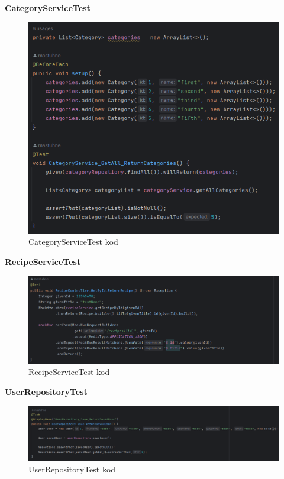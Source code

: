 			\eject
			\noindent\textbf{CategoryServiceTest}
			\begin{figure}[H]
				\includegraphics[scale=0.5]{slike/category_service_test.png}
				\centering
				\caption{CategoryServiceTest kod}
				\label{fig:cattest}
			\end{figure}

			\noindent\textbf{RecipeServiceTest}
			\begin{figure}[H]
				\includegraphics[scale=0.5]{slike/recipe_controller_test.png}
				\centering
				\caption{RecipeServiceTest kod}
				\label{fig:recest}
			\end{figure}

			\eject
			\noindent\textbf{UserRepositoryTest}
			\begin{figure}[H]
				\includegraphics[scale=0.4]{slike/user_repository_test.png}
				\centering
				\caption{UserRepositoryTest kod}
				\label{fig:recest}
			\end{figure}

